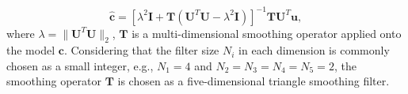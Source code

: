 \begin{equation}
\label{eq:shape}
\hat{\mathbf{c}} = [\lambda^2 \mathbf{I} + \mathbf{T} (\mathbf{U}^T\mathbf{U} -\lambda^2 \mathbf{I})]^{-1}\mathbf{T}\mathbf{U}^T\mathbf{u}, 
\end{equation}
where $\lambda=\parallel  \mathbf{U}^T\mathbf{U} \parallel_2$, $\mathbf{T}$ is a multi-dimensional smoothing operator applied onto the model $\mathbf{c}$.   Considering that the filter size $N_i$ in each dimension is commonly chosen as a small integer, e.g., $N_1=4$ and $N_2=N_3=N_4=N_5=2$, the smoothing operator $\mathbf{T}$ is chosen as a five-dimensional triangle smoothing filter. 


